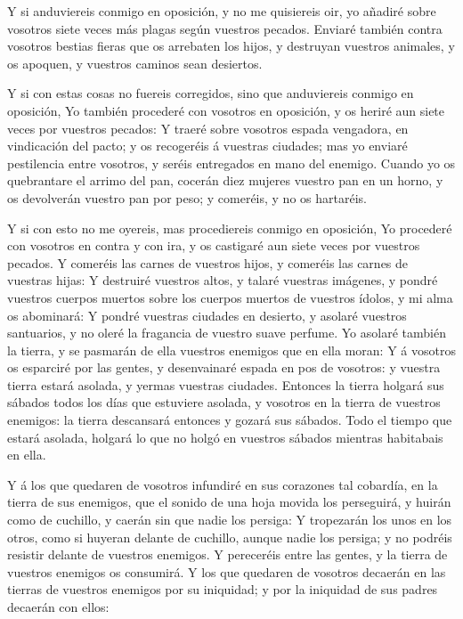  Y si anduviereis conmigo en oposición, y no me quisiereis
oir, yo añadiré sobre vosotros siete veces más plagas según vuestros
pecados.  Enviaré también contra vosotros bestias fieras
que os arrebaten los hijos, y destruyan vuestros animales, y os apoquen,
y vuestros caminos sean desiertos.

 Y si con estas cosas no fuereis corregidos, sino que
anduviereis conmigo en oposición,  Yo también procederé con
vosotros en oposición, y os heriré aun siete veces por vuestros pecados:
 Y traeré sobre vosotros espada vengadora, en vindicación
del pacto; y os recogeréis á vuestras ciudades; mas yo enviaré
pestilencia entre vosotros, y seréis entregados en mano del enemigo.
 Cuando yo os quebrantare el arrimo del pan, cocerán diez
mujeres vuestro pan en un horno, y os devolverán vuestro pan por peso; y
comeréis, y no os hartaréis.

 Y si con esto no me oyereis, mas procediereis conmigo en
oposición,  Yo procederé con vosotros en contra y con ira,
y os castigaré aun siete veces por vuestros pecados.  Y
comeréis las carnes de vuestros hijos, y comeréis las carnes de vuestras
hijas:  Y destruiré vuestros altos, y talaré vuestras
imágenes, y pondré vuestros cuerpos muertos sobre los cuerpos muertos de
vuestros ídolos, y mi alma os abominará:  Y pondré vuestras
ciudades en desierto, y asolaré vuestros santuarios, y no oleré la
fragancia de vuestro suave perfume.  Yo asolaré también la
tierra, y se pasmarán de ella vuestros enemigos que en ella moran:
 Y á vosotros os esparciré por las gentes, y desenvainaré
espada en pos de vosotros: y vuestra tierra estará asolada, y yermas
vuestras ciudades.  Entonces la tierra holgará sus sábados
todos los días que estuviere asolada, y vosotros en la tierra de
vuestros enemigos: la tierra descansará entonces y gozará sus sábados.
 Todo el tiempo que estará asolada, holgará lo que no holgó
en vuestros sábados mientras habitabais en ella.

 Y á los que quedaren de vosotros infundiré en sus
corazones tal cobardía, en la tierra de sus enemigos, que el sonido de
una hoja movida los perseguirá, y huirán como de cuchillo, y caerán sin
que nadie los persiga:  Y tropezarán los unos en los otros,
como si huyeran delante de cuchillo, aunque nadie los persiga; y no
podréis resistir delante de vuestros enemigos.  Y
pereceréis entre las gentes, y la tierra de vuestros enemigos os
consumirá.  Y los que quedaren de vosotros decaerán en las
tierras de vuestros enemigos por su iniquidad; y por la iniquidad de sus
padres decaerán con ellos:

